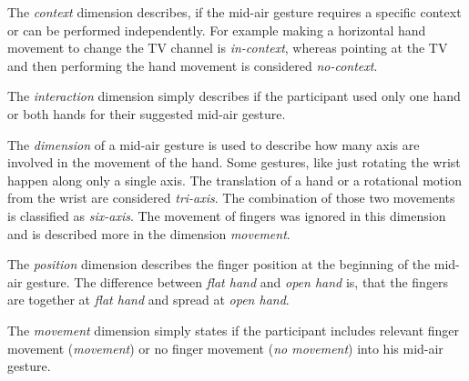 \documentclass[sigchi]{acmart}
\begin{document}
	The \textit{context} dimension describes, if the mid-air gesture requires a specific context or can be performed independently. For example making a horizontal hand movement to change the TV channel is \textit{in-context}, whereas pointing at the TV and then performing the hand movement is considered \textit{no-context}.
	
	The \textit{interaction} dimension simply describes if the participant used only one hand or both hands for their suggested mid-air gesture.
	
	The \textit{dimension} of a mid-air gesture is used to describe how many axis are involved in the movement of the hand. Some gestures, like just rotating the wrist happen along only a single axis. The translation of a hand or a rotational motion from the wrist are considered \textit{tri-axis}. The combination of those two movements is classified as \textit{six-axis}. The movement of fingers was ignored in this dimension and is described more in the dimension \textit{movement}.
	
	The \textit{position} dimension describes the finger position at the beginning of the mid-air gesture. The difference between \textit{flat hand} and \textit{open hand} is, that the fingers are together at \textit{flat hand} and spread at \textit{open hand}.
	
	The \textit{movement} dimension simply states if the participant includes relevant finger movement (\textit{movement}) or no finger movement (\textit{no movement}) into his mid-air gesture. 
	
\end{document}
